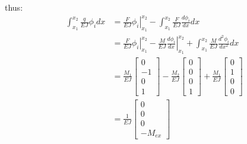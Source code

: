 thus:
\begin{equation}
    \begin{aligned}
        \int_{x_1}^{x_2}
        \frac{q}{EJ}\phi_i
        dx
        &=
        \left.
        \frac{F}{EJ}\phi_i
        \right|_{x_1}^{x_2}-
        \int_{x_1}^{x_2}
        \frac{F}{EJ}\frac{d\phi_i}{dx}
        dx\\
        &=
        \left.
        \frac{F}{EJ}\phi_i
        \right|_{x_1}^{x_2}
        -
        \left.
        \frac{M}{EJ}\frac{d\phi_i}{dx}
        \right|_{x_1}^{x_2}
        +
        \int_{x_1}^{x_2}
        \frac{M}{EJ}\frac{d^2\phi_i}{dx^2}
        dx\\
        &=
        \frac{M_1}{EJ}
        \begin{bmatrix}
            0\\-1\\0\\1
        \end{bmatrix}
        -
        \frac{M_2}{EJ}
        \begin{bmatrix}
            0\\0\\0\\1
        \end{bmatrix}
        +
        \frac{M_1}{EJ}
        \begin{bmatrix}
            0\\1\\0\\0
        \end{bmatrix}\\
        &=
        \frac{1}{EJ}
        \begin{bmatrix}
            0\\
            0\\
            0\\
            -M_{ex}
        \end{bmatrix}
    \end{aligned}
\end{equation}


